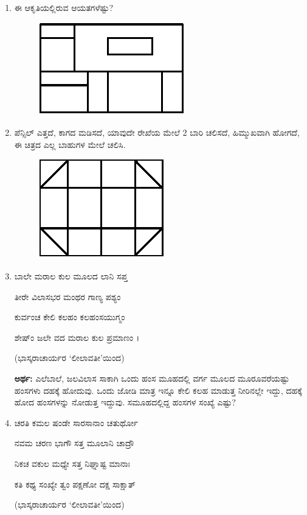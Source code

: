 \begin{enumerate}
\item ಈ ಆಕೃತಿಯಲ್ಲಿರುವ ಆಯತಗಳೆಷ್ಟು? 

\begin{figure}[H]
\centering
\includegraphics{images/chap6/q15.eps}
\end{figure}

\item ಪೆನ್ಸಿಲ್ ಎತ್ತದೆ, ಕಾಗದ ಮಡಿಸದೆ, ಯಾವುದೇ ರೇಖೆಯ ಮೇಲೆ 2 ಬಾರಿ ಚಲಿಸದೆ, ಹಿಮ್ಮುಖವಾಗಿ ಹೋಗದೆ, ಈ ಚಿತ್ರದ ಎಲ್ಲ ಬಾಹುಗಳ ಮೇಲೆ ಚಲಿಸಿ. 

\begin{figure}[H]
\centering
\includegraphics{images/chap6/q16.eps}
\end{figure}

\item ಬಾಲೇ ಮರಾಲ ಕುಲ ಮೂಲದ ಲಾನಿ ಸಪ್ತ 

ತೀರೇ ವಿಲಾಸಭರ ಮಂಥರ ಗಾಣ್ಯ ಪಶ್ಯಂ 

ಕುರ್ವಂಚ ಕೇಲಿ ಕಲಹಂ ಕಲಹಂಸಯುಗ್ಮಂ 

ಶೇಷ್ಂ ಜಲೇ ವದ ಮರಾಲ ಕುಲ ಪ್ರಮಾಣಂ ।

\hfill (ಭಾಸ್ಕರಾಚಾರ್ಯರ `ಲೀಲಾವತೀ'ಯಿಂದ)


{\bf ಅರ್ಥ:} ಎಲೆಬಾಲೆ, ಜಲವಿಲಾಸ ಸಾಕಾಗಿ ಒಂದು ಹಂಸ ಮೂಹದಲ್ಲಿ ವರ್ಗ ಮೂಲದ ಮೂರೂವರೆಯಷ್ಟು ಹಂಸಗಳು ದಹಕ್ಕೆ ಹೋದುವು. ಒಂದು ಜೋಡಿ ಮಾತ್ರ ಇನ್ನೂ ಕೇಲಿ ಕಲಹ ಮಾಡುತ್ತ ನೀರಿನಲ್ಲೇ ಇದ್ದು, ದಹಕ್ಕೆ ಹೋದ ಹಂಸಗಳನ್ನು ನೋಡುತ್ತ ಇದ್ದುವು. ಸಮೂಹದಲ್ಲಿದ್ದ ಹಂಸಗಳ ಸಂಖ್ಯೆ ಎಷ್ಟು? 

\item ಚರತಿ ಕಮಲ ಷಂಡೇ ಸಾರಸಾನಾಂ ಚತುರ್ಥೋ 

ನವಮ ಚರಣ ಭಾಗೌ ಸತ್ತ ಮೂಲಾನಿ ಚಾದ್ರೌ 

ನಿಕಚ ವಕುಲ ಮಧ್ಯೇ ಸತ್ತ ನಿಘ್ನಾಷ್ಟ ಮಾನಾಃ 

ಕತಿ ಕಥ್ಯ ಸಂಖ್ಯೇ ತ್ವಂ ಪಕ್ಷಣೋ ದಕ್ಷ ಸಾಕ್ಷಾತ್ 
\begin{flushright}
(ಭಾಸ್ಕರಾಚಾರ್ಯರ `ಲೀಲಾವತೀ'ಯಿಂದ)
\end{flushright}


\end{enumerate}
